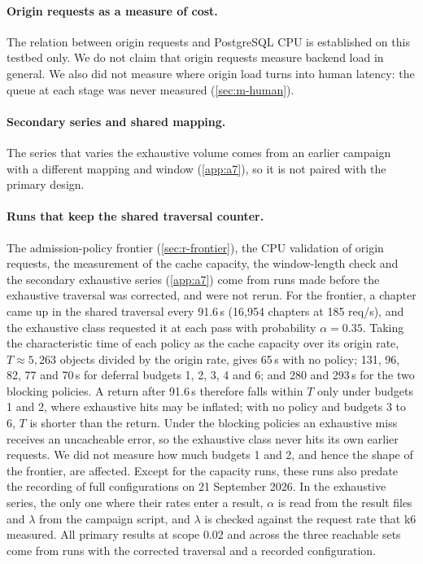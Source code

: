 \paragraph{Origin requests as a measure of cost.}
The relation between origin requests and PostgreSQL CPU is established on this testbed
only.
We do not claim that origin requests measure backend load in general.
We also did not measure where origin load turns into human latency: the queue at each
stage was never measured (\cref{sec:m-human}).

\paragraph{Secondary series and shared mapping.}
The series that varies the exhaustive volume comes from an earlier campaign with a
different mapping and window (\cref{app:a7}), so it is not paired with the primary
design.

\paragraph{Runs that keep the shared traversal counter.}
The admission-policy frontier (\cref{sec:r-frontier}), the CPU validation of origin
requests, the measurement of the cache capacity, the window-length check and the secondary
exhaustive series (\cref{app:a7}) come from runs made before the exhaustive traversal was
corrected, and were not rerun.
For the frontier, a chapter came up in the shared traversal every 91.6\,s (16,954 chapters
at 185 req/s), and the exhaustive class requested it at each pass with probability
$\alpha = 0.35$.
Taking the characteristic time of each policy as the cache capacity over its origin rate,
$T \approx 5{,}263$ objects divided by the origin rate, gives 65\,s with no policy; 131,
96, 82, 77 and 70\,s for deferral budgets 1, 2, 3, 4 and 6; and 280 and 293\,s for the two
blocking policies.
A return after 91.6\,s therefore falls within $T$ only under budgets 1 and 2, where
exhaustive hits may be inflated; with no policy and budgets 3 to 6, $T$ is shorter than the
return.
Under the blocking policies an exhaustive miss receives an uncacheable error, so the
exhaustive class never hits its own earlier requests.
We did not measure how much budgets 1 and 2, and hence the shape of the frontier, are
affected.
Except for the capacity runs, these runs also predate the recording of full configurations
on 21 September 2026.
In the exhaustive series, the only one where their rates enter a result, $\alpha$ is read
from the result files and $\lambda$ from the campaign script, and $\lambda$ is checked
against the request rate that k6 measured.
All primary results at scope 0.02 and across the three reachable sets come from runs with
the corrected traversal and a recorded configuration.
